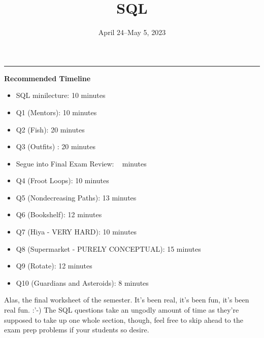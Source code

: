 \documentclass{exam}
\title{SQL}
\date{April 24--May 5, 2023}
\begin{document}
\maketitle\rule{\textwidth}{0.15em}

\begin{guide}

    \textbf{Recommended Timeline}
    \begin{itemize}
        \item SQL minilecture: 10 minutes
        \item Q1 (Mentors): 10 minutes
        \item Q2 (Fish): 20 minutes
        \item Q3 (Outfits) : 20 minutes
        \item Segue into Final Exam Review: ~ minutes
        \item Q4 (Froot Loops): 10 minutes
        \item Q5 (Nondecreasing Paths): 13 minutes
        \item Q6 (Bookshelf): 12 minutes
        \item Q7 (Hiya - VERY HARD): 10 minutes
        \item Q8 (Supermarket - PURELY CONCEPTUAL): 15 minutes
        \item Q9 (Rotate): 12 minutes
        \item Q10 (Guardians and Asteroids): 8 minutes
    \end{itemize}

    Alas, the final worksheet of the semester. It's been real, it's been fun, it's been real fun. :'-) The SQL questions take an ungodly amount of time as they're supposed to take up one whole section, though, feel free to skip ahead to the exam prep problems if your students so desire.

\end{guide}

\end{document}
